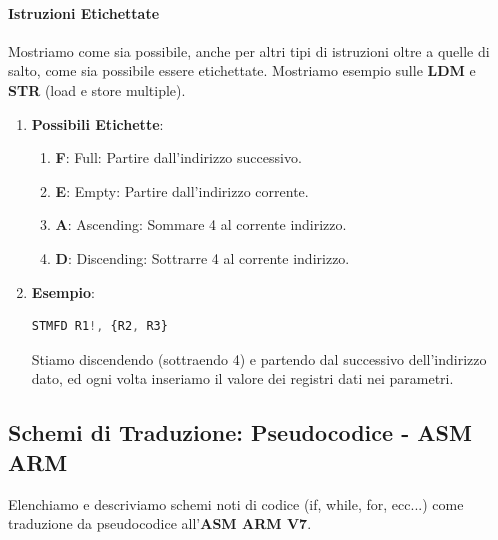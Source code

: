 \documentclass{article}
\begin{document}
\paragraph{Istruzioni Etichettate} Mostriamo come sia possibile, anche per altri tipi di istruzioni oltre a quelle di salto, come sia possibile essere etichettate. Mostriamo esempio sulle \textbf{LDM} e \textbf{STR} (load e store multiple).

\begin{enumerate}
    \item \textbf{Possibili Etichette}:
    \begin{enumerate}
        \item \textbf{F}: Full: Partire dall'indirizzo successivo.
        \item \textbf{E}: Empty: Partire dall'indirizzo corrente.
        \item \textbf{A}: Ascending: Sommare 4 al corrente indirizzo.
        \item \textbf{D}: Discending: Sottrarre 4 al corrente indirizzo. 
    \end{enumerate}
    \item \textbf{Esempio}:
\begin{lstlisting}[language = JavaScript]
    STMFD R1!, {R2, R3}
\end{lstlisting}
\vspace*{-20px}

Stiamo discendendo (sottraendo 4) e partendo dal successivo dell'indirizzo dato, ed ogni volta inseriamo il valore dei registri dati nei parametri.

\end{enumerate}

\newpage

\subsection{Schemi di Traduzione: Pseudocodice - ASM ARM}

Elenchiamo e descriviamo schemi noti di codice (if, while, for, ecc...) come traduzione da pseudocodice all'\textbf{ASM ARM V7}.
\end{document}
